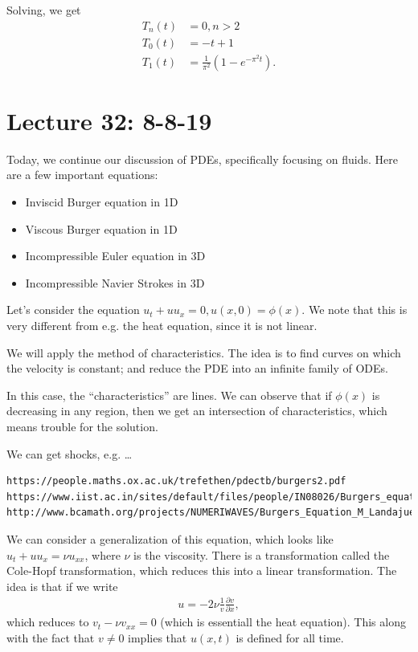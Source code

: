 \documentclass{article}
\begin{document}
Solving, we get
\begin{align*}
  T_n(t) &= 0, n > 2 \\
  T_0(t) &= -t + 1 \\
  T_1(t) &= \frac{1}{\pi^2} \left( 1 - e^{- \pi^2 t} \right).
\end{align*}

\section{Lecture 32: 8-8-19}

Today, we continue our discussion of PDEs, specifically focusing on fluids.  Here are a few important equations:

\begin{itemize}
  \item Inviscid Burger equation in 1D
  \item Viscous Burger equation in 1D
  \item Incompressible Euler equation in 3D
  \item Incompressible Navier Strokes in 3D
\end{itemize}

Let's consider the equation $u_t + u u_x = 0, u(x, 0) = \phi(x)$.  We note that this is very different from e.g. the heat equation, since it is not linear.

We will apply the method of characteristics.  The idea is to find curves on which the velocity is constant; and reduce the PDE into an infinite family of ODEs.

In this case, the ``characteristics'' are lines.  We can observe that if $\phi(x)$ is decreasing in any region, then we get an intersection of characteristics, which means trouble for the solution.

We can get shocks, e.g. \dots
\begin{verbatim}
https://people.maths.ox.ac.uk/trefethen/pdectb/burgers2.pdf
https://www.iist.ac.in/sites/default/files/people/IN08026/Burgers_equation_inviscid.pdf
http://www.bcamath.org/projects/NUMERIWAVES/Burgers_Equation_M_Landajuela.pdf
\end{verbatim}

We can consider a generalization of this equation, which looks like $u_t + u u_x = \nu u_{xx}$, where $\nu$ is the viscosity.  There is a transformation called the Cole-Hopf transformation, which reduces this into a linear transformation.  The idea is that if we write
\begin{align*}
  u = - 2 \nu \frac{1}{v} \frac{\partial v}{\partial x},
\end{align*}
which reduces to $v_t - \nu v_{xx} = 0$ (which is essentiall the heat equation).  This along with the fact that $v \neq 0$ implies that $u(x, t)$ is defined for all time.
\end{document}
